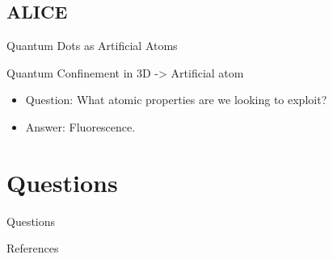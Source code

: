 \documentclass{beamer}
\begin{document}
\subsection[ALICE]{ALICE}

\begin{frame}{Quantum Dots as Artificial Atoms}{}

  Quantum Confinement in 3D -> Artificial atom
  \begin{itemize}
  \item
   Question: What atomic properties are we looking to exploit?
   \pause
  \item
    Answer: Fluorescence.
  \end{itemize}
\end{frame}


\section*{Questions}

\begin{frame}
\centering
Questions
\end{frame}
\begin{frame}[allowframebreaks]{References}  %

    \def\bibfont{\scriptsize}
    

\end{frame} 
\end{document}
